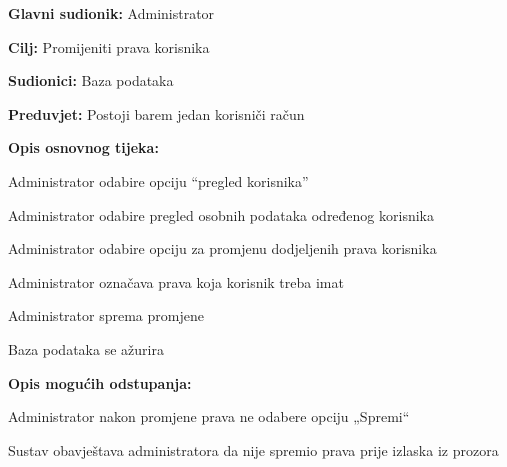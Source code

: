 					\noindent {}
					\begin{packed_item}
	
						\item \textbf{Glavni sudionik: }  Administrator
						\item  \textbf{Cilj:} Promijeniti prava korisnika
						\item  \textbf{Sudionici:} Baza podataka
						\item  \textbf{Preduvjet:} Postoji barem jedan korisniči račun
						\item  \textbf{Opis osnovnog tijeka:} 
						
						
						\item[] \begin{packed_enum}
	
							\item Administrator odabire opciju “pregled korisnika”
							\item Administrator odabire pregled osobnih podataka određenog korisnika
							\item Administrator odabire opciju za promjenu dodjeljenih prava korisnika
							\item Administrator označava prava koja korisnik treba imat
							\item Administrator sprema promjene
							\item Baza podataka se ažurira
							
						\end{packed_enum}
						
						\item  \textbf{Opis mogućih odstupanja:}
						
						\item[] \begin{packed_item}
	
							\item[1.a] Administrator nakon promjene prava ne odabere opciju 
							„Spremi“
							
							
							\item[] \begin{packed_enum}
								
								\item Sustav obavještava administratora da nije spremio prava 
								prije izlaska iz prozora 
								
							\end{packed_enum}
							
						\end{packed_item}
					\end{packed_item}
